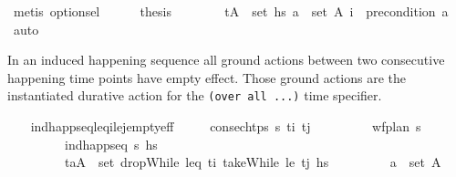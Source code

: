 \begin{isabellebody}
\ {\isacharparenleft}{\kern0pt}metis\ option{\isachardot}{\kern0pt}sel{\isacharparenright}{\kern0pt}\isanewline
\ \ \ \ \isamarkupfalse%
\ {\isacharquery}{\kern0pt}thesis\isanewline
\ \ \ \ \ \ \isamarkupfalse%
\ {\isacartoucheopen}{\isacharparenleft}{\kern0pt}t{\isacharcomma}{\kern0pt}A{\isacharparenright}{\kern0pt}\ {\isasymin}\ set\ {\isacharquery}{\kern0pt}hs{\isacharprime}{\kern0pt}{\isacartoucheclose}\ {\isacartoucheopen}a\ {\isasymin}\ set\ A{\isacartoucheclose}\ {\isacartoucheopen}i\ {\isacharequal}{\kern0pt}\ precondition\ a{\isacartoucheclose}\ \isamarkupfalse%
\ auto\isanewline
\ \ \isamarkupfalse%
%
\endisatagproof
{\isafoldproof}%
%
\isadelimproof
%
\endisadelimproof
%
\begin{isamarkuptext}%
In an induced happening sequence all ground actions between two consecutive happening 
  time points have empty effect. Those ground actions are the instantiated durative action 
  for the \texttt{(over all ...)} time specifier.%
\end{isamarkuptext}\isamarkuptrue%
\ \ \isamarkupfalse%
\ ind{\isacharunderscore}{\kern0pt}happ{\isacharunderscore}{\kern0pt}seq{\isacharunderscore}{\kern0pt}leq\isactrlsub i{\isacharunderscore}{\kern0pt}le\isactrlsub j{\isacharunderscore}{\kern0pt}empty{\isacharunderscore}{\kern0pt}eff{\isacharcolon}{\kern0pt}\isanewline
\ \ \ \ \ {\isachardoublequoteopen}consec{\isacharunderscore}{\kern0pt}htps\ {\isasympi}s\ t\isactrlsub i\ t\isactrlsub j{\isachardoublequoteclose}\isanewline
\ \ \ \ \ \ \ \ \ {\isachardoublequoteopen}wf{\isacharunderscore}{\kern0pt}plan\ {\isasympi}s{\isachardoublequoteclose}\isanewline
\ \ \ \ \ \ \ \ \ {\isachardoublequoteopen}ind{\isacharunderscore}{\kern0pt}happ{\isacharunderscore}{\kern0pt}seq\ {\isasympi}s\ hs{\isachardoublequoteclose}\isanewline
\ \ \ \ \ \ \ \ \ {\isachardoublequoteopen}{\isacharparenleft}{\kern0pt}t\isactrlsub a{\isacharcomma}{\kern0pt}A{\isacharparenright}{\kern0pt}\ {\isasymin}\ set\ {\isacharparenleft}{\kern0pt}dropWhile\ {\isacharparenleft}{\kern0pt}leq\ t\isactrlsub i{\isacharparenright}{\kern0pt}\ {\isacharparenleft}{\kern0pt}takeWhile\ {\isacharparenleft}{\kern0pt}le\ t\isactrlsub j{\isacharparenright}{\kern0pt}\ hs{\isacharparenright}{\kern0pt}{\isacharparenright}{\kern0pt}{\isachardoublequoteclose}\isanewline
\ \ \ \ \ \ \ \ \ {\isachardoublequoteopen}a\ {\isasymin}\ set\ A{\isachardoublequoteclose}\isanewline

\end{isabellebody}
